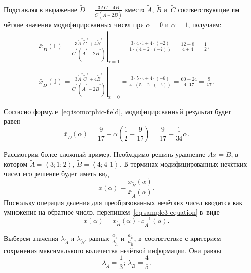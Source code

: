 Подставляя в выражение $\displaystyle \tilde{D}=\frac{3\tilde{A}\tilde{C}+4\tilde{B}}{\tilde{C}\left( \tilde{A}-2\tilde{B} \right)}$ вместо $\tilde A$, $\tilde B$ и~$\tilde C$ соответствующие им чёткие значения модифицированных чисел при $\alpha=0$ и $\alpha=1$, получаем:
\begin{gather*}
  \bar{x}_{\tilde D}\left( 1 \right)={{\left. \frac{3{{\tilde A}^{*}}{{\tilde C}^{*}}+4{{\tilde B}^{*}}}{{{\tilde C}^{*}}\left( {{\tilde A}^{*}}-2{{\tilde B}^{*}} \right)} \right|}_{\alpha =1}}=\frac{3\cdot 4\cdot 1+4\cdot \left( -2 \right)}{1\cdot \left( 4-2\cdot \left( -2 \right) \right)}=\frac{12-8}{4+4}=\frac{1}{2}, \\
  {{\bar{x}}_{\tilde D}}\left( 0 \right)={{\left. \frac{3{{\tilde A}^{*}}{{\tilde C}^{*}}+4{{\tilde B}^{*}}}{{{\tilde C}^{*}}\left( {{\tilde A}^{*}}-2{{\tilde B}^{*}} \right)} \right|}_{\alpha =0}}=\frac{3\cdot 5\cdot 4+4\cdot \left( -6 \right)}{4\cdot \left( 5-2\cdot \left( -6 \right) \right)}=\frac{60-24}{4\cdot 17}=\frac{9}{17}.
\end{gather*}

Согласно формуле~\eqref{eq:isomorphic-field}, модифицированный результат будет равен
\begin{equation*}
  \bar{x}_{\tilde D}\left( \alpha \right)=\frac{9}{17}+\alpha \left(\frac{1}{2}-\frac{9}{17} \right)=\frac{9}{17}-\frac{1}{34}\alpha.
\end{equation*}
	
Рассмотрим более сложный пример. Необходимо решить уравнение $\tilde{A}x=\tilde{B}$, в котором $\tilde{A}=\left\langle 3;1;2 \right\rangle $, $\tilde{B}=\left\langle 4;4;1 \right\rangle $. В терминах модифицированных нечётких чисел его решение будет иметь вид
\begin{equation}
\label{eq:sample3-equation}
  x\left( \alpha  \right)=\frac{\bar{x}_{\tilde B}\left( \alpha  \right)}{\bar{x}_{\tilde A}\left(\alpha \right)}.
\end{equation}
Поскольку операция деления для преобразованных нечётких чисел вводится как умножение на обратное число, перепишем~\eqref{eq:sample3-equation} в~виде
\begin{equation}
\label{eq:sample3-equation-modified}
  x\left( \alpha  \right)=\bar x_{\tilde B}\left( \alpha  \right)\cdot \bar{x}_{\tilde A}^{-1}\left( \alpha  \right).
\end{equation}

Выберем значения $\lambda_{\tilde A}$ и $\lambda_{\tilde B}$, равные $\displaystyle \frac{a_{\tilde A}}{d_{\tilde A}}$ и~$\displaystyle \frac{a_{\tilde B}}{d_{\tilde B}}$, в~соответствие с критерием сохранения максимального количества нечёткой информации. Они равны
\begin{equation}
\label{eq:sample3-opt-lambda}
  {{\lambda }_{\tilde A}}=\frac{1}{3};\ {{\lambda }_{\tilde B}}=\frac{4}{5}.
\end{equation}

